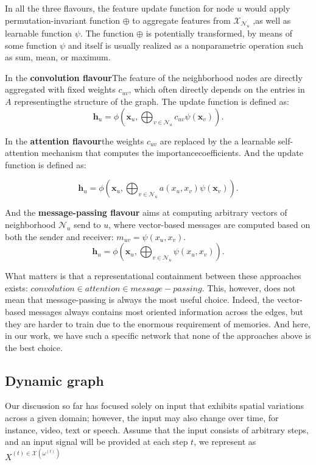     In all the three flavours, the feature update function for node $u$ would apply permutation-invariant function $\oplus$ to aggregate features from $\mathcal{X}_{\mathcal{N}_u}$ ,as well as learnable function $\psi$. The function $\oplus$ is potentially transformed, by means of some function $\psi$ and itself is usually realized as a nonparametric operation such as sum, mean, or maximum.


    In the \textbf{convolution flavour}\cite{kipf2016semi,defferrard2016convolutional,wu2019simplifying}The feature of the neighborhood nodes are directly aggregated with fixed weights $c_{uv}$, which often directly depends on the entries in $A$ representingthe structure of the graph. The update function is defined as:
    \[
    \mathbf{h}_u = \phi \left( \mathbf{x}_u, \bigoplus_{v \in \mathcal{N}_u} c_{uv} \psi(\mathbf{x}_v) \right).
    \]


    In the \textbf{attention flavour}\cite{velickovic2017graph,monti2017geometric,zhang2018gaan}the weights $c_{uv}$ are replaced by the a learnable self-attention mechanism that computes the importancecoefficients. And the update function is defined as:

    \[
        \mathbf{h}_u = \phi \left( \mathbf{x}_u, \bigoplus_{v \in \mathcal{N}_u} a(x_u,x_v) \psi(\mathbf{x}_v) \right).
    \]

    And the \textbf{message-passing flavour}\cite{gilmer2017neural,battaglia2018relational} aims at computing arbitrary vectors of neighborhood $\mathcal{N}_u$ send to $u$, where vector-based messages are computed based on both the sender and receiver: $m_{uv} = \psi (x_u, x_v)$.
    \[
        \mathbf{h}_u = \phi \left( \mathbf{x}_u, \bigoplus_{v \in \mathcal{N}_u} \psi (x_u, x_v) \right).
    \]

    What matters is that a representational containment between these approaches exists: $convolution \in attention \in message-passing $. This, however, does not mean that message-passing is always the most useful choice. Indeed, the vector-based messages always contains most oriented information across the edges, but they are harder to train due to the enormous requirement of memories. And here, in our work, we have such a specific network that none of the approaches above is the best choice.
 

    \subsection{Dynamic graph}
    Our discussion so far has focused solely on input that exhibits spatial variations across a given domain; however, the input may also change over time, for instance, video, text or speech.
    Assume that the input consists of arbitrary steps, and an input signal will be provided at each step $t$, we represent as $X^{(t) \in \mathcal{X} (\omega^{(t)})}$

